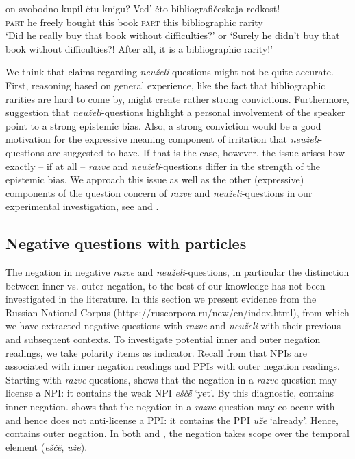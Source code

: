 \documentclass[output=paper,colorlinks,citecolor=brown]{langscibook}
\begin{document}
\ea\label{ex:05:5}
 on svobodno kupil ėtu knigu? {Ved'} ėto bibliografičeskaja redkost!\\
{\textsc{part}} he freely bought this book {\textsc{part}} this bibliographic rarity\\
\glt `Did he really buy that book without difficulties?' or `Surely he didn't buy that book without difficulties?! After all, it is a bibliographic rarity!'
\z

We think that  claims regarding \textit{neuželi}-questions might not be quite accurate. First, reasoning based on general experience, like the fact that bibliographic rarities are hard to come by, might create rather strong convictions. Furthermore,  suggestion that \textit{neuželi}-questions highlight a personal involvement of the speaker point to a strong epistemic bias. Also, a strong conviction would be a good motivation for the expressive meaning component of irritation that \textit{neuželi}-questions are suggested to have. If that is the case, however, the issue arises how exactly – if at all – \textit{razve}  and \textit{neuželi}-questions differ in the strength of the epistemic bias. We approach this issue as well as the other (expressive) components of the question concern of \textit{razve}  and \textit{neuželi}-questions in our experimental investigation, see  and .

\subsection{Negative questions with particles}\label{sec:05:3:2}
The negation in negative \textit{razve} and \textit{neuželi}-questions, in particular the distinction between inner vs. outer negation, to the best of our knowledge has not been investigated in the literature. In this section we present evidence from the Russian National Corpus (https://ruscorpora.ru/new/en/index.html), from which we have extracted negative questions with \textit{razve} and \textit{neuželi} with their previous and subsequent contexts. To investigate potential inner and outer negation readings, we take polarity items as indicator. Recall from  that NPIs are associated with inner negation readings and PPIs with outer negation readings. Starting with \textit{razve}-questions,  shows that the negation in a \textit{razve}-question may license a NPI: it contains the weak NPI \textit{eščë} `yet'. By this diagnostic,  contains inner negation.  shows that the negation in a \textit{razve}-question may co-occur with and hence does not anti-license a PPI: it contains the PPI \textit{uže} `already'. Hence,  contains outer negation. In both  and , the negation takes scope over the temporal element (\textit{eščë}, \textit{uže}).
\end{document}
